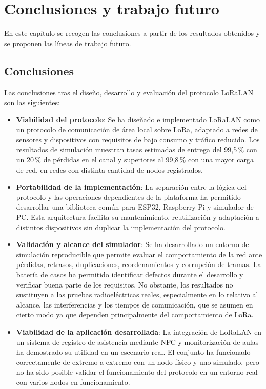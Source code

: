\chapter{Conclusiones y trabajo futuro}\label{chap:8}

En este capítulo se recogen las conclusiones a partir de los resultados obtenidos y se proponen las líneas de trabajo futuro.

\section{Conclusiones}

Las conclusiones tras el diseño, desarrollo y evaluación del protocolo LoRaLAN son las siguientes:

\begin{itemize}

\item \textbf{Viabilidad del protocolo}: Se ha diseñado e implementado LoRaLAN como un protocolo de comunicación de área local sobre LoRa, adaptado a redes de sensores y dispositivos con requisitos de bajo consumo y tráfico reducido. Los resultados de simulación muestran tasas estimadas de entrega del 99,5\,\% con un 20\,\% de pérdidas en el canal y superiores al 99,8\,\% con una mayor carga de red, en redes con distinta cantidad de nodos registrados.

\item \textbf{Portabilidad de la implementación}: La separación entre la lógica del protocolo y las operaciones dependientes de la plataforma ha permitido desarrollar una biblioteca común para ESP32, Raspberry Pi y simulador de PC. Esta arquitectura facilita su mantenimiento, reutilización y adaptación a distintos dispositivos sin duplicar la implementación del protocolo.

\item \textbf{Validación y alcance del simulador}: Se ha desarrollado un entorno de simulación reproducible que permite evaluar el comportamiento de la red ante pérdidas, retrasos, duplicaciones, reordenamientos y corrupción de tramas. La batería de casos ha permitido identificar defectos durante el desarrollo y verificar buena parte de los requisitos. No obstante, los resultados no sustituyen a las pruebas radioeléctricas reales, especialmente en lo relativo al alcance, las interferencias y los tiempos de comunicación, que se asumen en cierto modo ya que dependen principalmente del comportamiento de LoRa.

\item \textbf{Viabilidad de la aplicación desarrollada}: La integración de LoRaLAN en un sistema de registro de asistencia mediante NFC y monitorización de aulas ha demostrado su utilidad en un escenario real. El conjunto ha funcionado correctamente de extremo a extremo con un nodo físico y uno simulado, pero no ha sido posible validar el funcionamiento del protocolo en un entorno real con varios nodos en funcionamiento.


\end{itemize}
